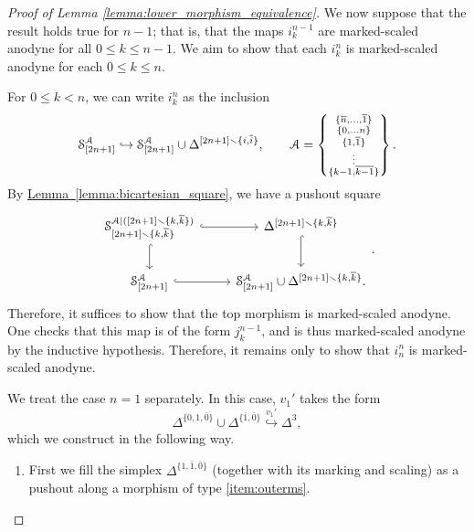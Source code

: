 \documentclass[main.tex]{subfiles}
\begin{document}
\begin{proof}[Proof of Lemma \ref{lemma:lower_morphism_equivalence}]
  We now suppose that the result holds true for $n-1$; that is, that the maps $i^{n-1}_{k}$ are marked-scaled anodyne for all $0 \leq k \leq n-1$. We aim to show that each $i^{n}_{k}$ is marked-scaled anodyne for each $0 \leq k \leq n$.

  For $0 \leq k < n$, we can write $i^{n}_{k}$ as the inclusion
  \begin{equation*}
    \S^{\mathcal{A}}_{[2n+1]} \hookrightarrow \S^{\mathcal{A}}_{[2n+1]} \cup \Delta^{[2n+1] \smallsetminus \{i, \overline{i}\}},\qquad \mathcal{A}
    = \left\{ \substack{ \{\overline{n}, \ldots, \overline{1}\} \\ \{0, \ldots n\} \\ \{1, \overline{1}\} \\ \vdots \\ \{k-1, \overline{k-1}\} } \right\}.
  \end{equation*}
  By \hyperref[lemma:bicartesian_square]{Lemma~\ref*{lemma:bicartesian_square}}, we have a pushout square
  \begin{equation*}
    \begin{tikzcd}
      \S^{\mathcal{A}|([2n+1] \smallsetminus \{k, \overline{k}\})}_{[2n+1] \smallsetminus \{k, \overline{k}\}}
      \arrow[r, hook]
      \arrow[d, hook]
      & \Delta^{[2n+1] \smallsetminus \{k, \overline{k}\}}
      \arrow[d, hook]
      \\
      \S^{\mathcal{A}}_{[2n+1]}
      \arrow[r, hook]
      & \S^{\mathcal{A}}_{[2n+1]} \cup \Delta^{[2n+1] \smallsetminus \{k, \overline{k}\}}.
    \end{tikzcd}.
  \end{equation*}
  Therefore, it suffices to show that the top morphism is marked-scaled anodyne. One checks that this map is of the form $j^{n-1}_{k}$, and is thus marked-scaled anodyne by the inductive hypothesis. Therefore, it remains only to show that $i^{n}_{n}$ is marked-scaled anodyne.

  We treat the case $n = 1$ separately. In this case, $v_{1}'$ takes the form
  \begin{equation*}
    \Delta^{\{0,1,\overline{0}\}} \cup \Delta^{\{\overline{1},\overline{0}\}} \overset{v_{1}'}{\hookrightarrow} \Delta^{3},
  \end{equation*}
  which we construct in the following way.
  \begin{enumerate}
    \item First we fill the simplex $\Delta^{\{1,\overline{1},\overline{0}\}}$ (together with its marking and scaling) as a pushout along a morphism of type \ref{item:outerms}.


\end{enumerate}
\end{proof}
\end{document}
